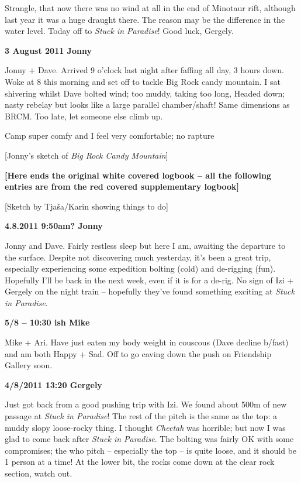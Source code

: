 Strangle, that now there was no wind at all in the end of Minotaur rift,
although last year it was a huge draught there. The reason may be the
difference in the water level. Today off to \emph{Stuck in Paradise}!
Good luck, Gergely.

\textbf{3 August 2011 Jonny}

Jonny + Dave. Arrived 9 o'clock last night after faffing all day, 3
hours down. Woke at 8 this morning and set off to tackle Big Rock candy
mountain. I sat shivering whilst Dave bolted wind; too muddy, taking too
long, Headed down; nasty rebelay but looks like a large parallel
chamber/shaft! Same dimensions as BRCM. Too late, let someone else climb
up.

Camp super comfy and I feel very comfortable; no rapture

{[}Jonny's sketch of \emph{Big Rock Candy Mountain}{]}

\textbf{{[}Here ends the original white covered logbook -- all the
following entries are from the red covered supplementary logbook{]}}

{[}Sketch by Tjaša/Karin showing things to do{]}

\textbf{4.8.2011 9:50am? Jonny}

Jonny and Dave. Fairly restless sleep but here I am, awaiting the
departure to the surface. Despite not discovering much yesterday, it's
been a great trip, especially experiencing some expedition bolting
(cold) and de-rigging (fun). Hopefully I'll be back in the next week,
even if it is for a de-rig. No sign of Izi + Gergely on the night train
-- hopefully they've found something exciting at \emph{Stuck in
Paradise}.

\textbf{5/8 -- 10:30 ish Mike}

Mike + Ari. Have just eaten my body weight in couscous (Dave decline
b/fast) and am both Happy + Sad. Off to go caving down the push on
Friendship Gallery soon.

\textbf{4/8/2011 13:20 Gergely}

Just got back from a good pushing trip with Izi. We found about 500m of
new passage at \emph{Stuck in Paradise}! The rest of the pitch is the
same as the top: a muddy slopy loose-rocky thing. I thought
\emph{Cheetah} was horrible; but now I was glad to come back after
\emph{Stuck in Paradise}. The bolting was fairly OK with some
compromises; the who pitch -- especially the top -- is quite loose, and
it should be 1 person at a time! At the lower bit, the rocks come down
at the clear rock section, watch out.

